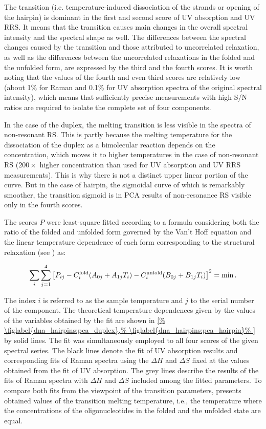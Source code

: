 The transition (i.e. temperature-induced dissociation of the strands or opening
of the hairpin) is dominant in the first and second score of UV absorption and
UV RRS.
It means that the transition causes main changes in the overall spectral
intensity and the spectral shape as well.
The differences between the spectral changes caused by the transition and those
attributed to uncorrelated relaxation, as well as the differences between the
uncorrelated relaxations in the folded and the unfolded form, are expressed by
the third and the fourth scores.
It is worth noting that the values of the fourth and even third scores are
relatively low (about 1\% for Raman and 0.1\% for UV absorption spectra of the
original spectral intensity), which means that sufficiently precise
measurements with high S/N ratios are required to isolate the complete set of
four components.

In the case of the duplex, the melting transition is less visible in the
spectra of non-resonant RS.
This is partly because the melting temperature for the dissociation of the
duplex as a bimolecular reaction depends on the concentration, which moves it
to higher temperatures in the case of non-resonant RS ($200\times$ higher
concentration than used for UV absorption and UV RRS measurements).
This is why there is not a distinct upper linear portion of the curve.
But in the case of hairpin, the sigmoidal curve of which is remarkably
smoother, the transition sigmoid is in PCA results of non-resonance RS visible
only in the fourth scores.

The scores $P$ were least-square fitted according to a formula considering both
the ratio of the folded and unfolded form governed by the Van’t Hoff equation
and the linear temperature dependence of each form corresponding to the
structural relaxation (see
)
as:

\begin{equation*}
	\sum_i\sum_{j=1}^4\left[
		P_{ij} - C_i^\text{fold}(A_{0j} + A_{1j}T_i)
		- C_i^\text{unfold}(B_{0j} + B_{1j}T_i)
	\right]^2 = \operatorname{min}.
\end{equation*}

The index $i$ is referred to as the sample temperature and $j$ to the serial
number of the component.
The theoretical temperature dependences given by the values of the variables
obtained by the fit are shown in
\cref{%
	\figlabel{dna_hairpins:pca_duplex},%
	\figlabel{dna_hairpins:pca_hairpin}%
}
by solid lines.
The fit was simultaneously employed to all four scores of the given spectral
series.
The black lines denote the fit of UV absorption results and corresponding fits
of Raman spectra using the $\Delta{}H$ and $\Delta{}S$ fixed at the values
obtained from the fit of UV absorption.
The grey lines describe the results of the fits of Raman spectra with
$\Delta{}H$ and $\Delta{}S$ included among the fitted parameters.
To compare both fits from the viewpoint of the transition parameters,
presents obtained values of the transition melting temperature, i.e., the
temperature where the concentrations of the oligonucleotides in the folded and
the unfolded state are equal.

